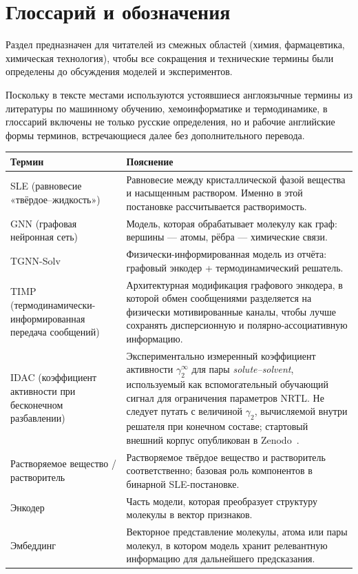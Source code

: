 \documentclass[11pt]{article}
\begin{document}
\section{Глоссарий и обозначения}
\label{sec:glossary}

Раздел предназначен для читателей из смежных областей (химия, фармацевтика, химическая технология), чтобы все сокращения и технические термины были определены до обсуждения моделей и экспериментов.

Поскольку в тексте местами используются устоявшиеся англоязычные термины из литературы по машинному обучению, хемоинформатике и термодинамике, в глоссарий включены не только русские определения, но и рабочие английские формы терминов, встречающиеся далее без дополнительного перевода.

\begin{longtable}{p{}p{}}
\textbf{Термин} & \textbf{Пояснение} \\
\hline
SLE (равновесие «твёрдое--жидкость») & Равновесие между кристаллической фазой вещества и насыщенным раствором. Именно в этой постановке рассчитывается растворимость. \\
GNN (графовая нейронная сеть) & Модель, которая обрабатывает молекулу как граф: вершины --- атомы, рёбра --- химические связи. \\
TGNN-Solv & Физически-информированная модель из отчёта: графовый энкодер + термодинамический решатель. \\
TIMP (термодинамически-информированная передача сообщений) & Архитектурная модификация графового энкодера, в которой обмен сообщениями разделяется на физически мотивированные каналы, чтобы лучше сохранять дисперсионную и полярно-ассоциативную информацию. \\
IDAC (коэффициент активности при бесконечном разбавлении) & Экспериментально измеренный коэффициент активности $\gamma_2^{\infty}$ для пары \textit{solute--solvent}, используемый как вспомогательный обучающий сигнал для ограничения параметров NRTL. Не следует путать с величиной $\gamma_2$, вычисляемой внутри решателя при конечном составе; стартовый внешний корпус опубликован в Zenodo~\cite{idac_zenodo}. \\
Растворяемое вещество / растворитель & Растворяемое твёрдое вещество и растворитель соответственно; базовая роль компонентов в бинарной SLE-постановке. \\
Энкодер & Часть модели, которая преобразует структуру молекулы в вектор признаков. \\
Эмбеддинг & Векторное представление молекулы, атома или пары молекул, в котором модель хранит релевантную информацию для дальнейшего предсказания. \\

\end{longtable}
\end{document}
